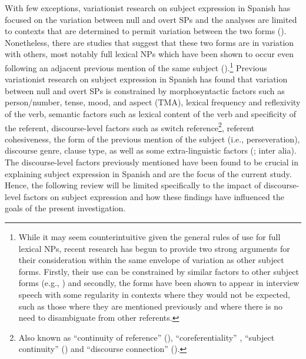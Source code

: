 \documentclass[output=paper]{langscibook}
\begin{document}
With few exceptions, variationist research on subject expression in Spanish has focused on the variation between null and overt SPs and the analyses are limited to contexts that are determined to permit variation between the two forms (\citealt{OtheguyZentella2007}). Nonetheless, there are studies that suggest that these two forms are in variation with others, most notably full lexical NPs which have been shown to occur even following an adjacent previous mention of the same subject (\citealt{Bentivoglio1993, Dumont2006, GudmestadGeeslin2022, GudmestadGeeslin2013, Silva-Corvalán2015}).\footnote{While it may seem counterintuitive given the general rules of use for full lexical NPs, recent research has begun to provide two strong arguments for their consideration within the same envelope of variation as other subject forms. Firstly, their use can be constrained by similar factors to other subject forms (e.g., \citealt{GudmestadGeeslin2022, Dumont2006}) and secondly, the forms have been shown to appear in interview speech with some regularity in contexts where they would not be expected, such as those where they are mentioned previously and where there is no need to disambiguate from other referents.} Previous variationist research on subject expression in Spanish has found that variation between null and overt SPs is constrained by morphosyntactic factors such as person/number, tense, mood, and aspect (TMA), lexical frequency and reflexivity of the verb, semantic factors such as lexical content of the verb and specificity of the referent, discourse-level factors such as switch reference\footnote{Also known as “continuity of reference” (\citealt{ShinOtheguy2009}), “coreferentiality” \citep{Silva-Corvalán1994}, “subject continuity” (\citealt{TorresTravis2010}) and “discourse connection” (\citealt{CarvalhoChild2011}).}, referent cohesiveness, the form of the previous mention of the subject (i.e., perseveration), discourse genre, clause type, as well as some extra-linguistic factors (\citealt{Ávila-Jiménez1995, BayleyPease-Alvarez1996, BayleyPease-Alvarez1997, Bentivoglio1987, Cameron1994,Cameron1995, CameronFlores-Ferrán2004, Enríquez1984, ErkerGuy2012, Flores-Ferrán2005, Hochberg1986, Morales1986, OtheguyLivert2007, OtheguyZentella2012, Shin2006, Shin2012, ShinCairns2009, ShinOtheguy2009, Silva-Corvalán1994, Travis2007, TorresTravis2010}; inter alia). The discourse-level factors previously mentioned have been found to be crucial in explaining subject expression in Spanish and are the focus of the current study. Hence, the following review will be limited specifically to the impact of discourse-level factors on subject expression and how these findings have influenced the goals of the present investigation.
\end{document}
